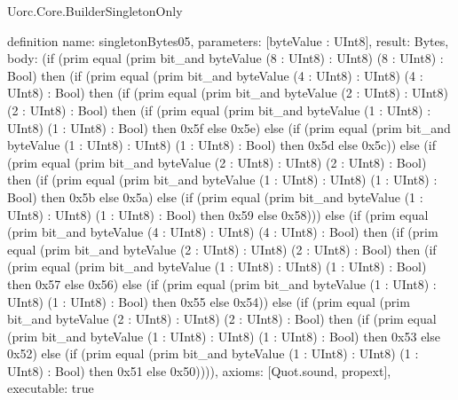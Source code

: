 \begin{lexlean}{Uorc.Core.BuilderSingletonOnly}
\begin{semanticmodule}
definition{
  name: singletonBytes05,
  parameters: [byteValue : UInt8],
  result: Bytes,
  body: (if (prim equal (prim bit_and byteValue (8 : UInt8) : UInt8) (8 : UInt8) : Bool) then (if (prim equal (prim bit_and byteValue (4 : UInt8) : UInt8) (4 : UInt8) : Bool) then (if (prim equal (prim bit_and byteValue (2 : UInt8) : UInt8) (2 : UInt8) : Bool) then (if (prim equal (prim bit_and byteValue (1 : UInt8) : UInt8) (1 : UInt8) : Bool) then 0x5f else 0x5e) else (if (prim equal (prim bit_and byteValue (1 : UInt8) : UInt8) (1 : UInt8) : Bool) then 0x5d else 0x5c)) else (if (prim equal (prim bit_and byteValue (2 : UInt8) : UInt8) (2 : UInt8) : Bool) then (if (prim equal (prim bit_and byteValue (1 : UInt8) : UInt8) (1 : UInt8) : Bool) then 0x5b else 0x5a) else (if (prim equal (prim bit_and byteValue (1 : UInt8) : UInt8) (1 : UInt8) : Bool) then 0x59 else 0x58))) else (if (prim equal (prim bit_and byteValue (4 : UInt8) : UInt8) (4 : UInt8) : Bool) then (if (prim equal (prim bit_and byteValue (2 : UInt8) : UInt8) (2 : UInt8) : Bool) then (if (prim equal (prim bit_and byteValue (1 : UInt8) : UInt8) (1 : UInt8) : Bool) then 0x57 else 0x56) else (if (prim equal (prim bit_and byteValue (1 : UInt8) : UInt8) (1 : UInt8) : Bool) then 0x55 else 0x54)) else (if (prim equal (prim bit_and byteValue (2 : UInt8) : UInt8) (2 : UInt8) : Bool) then (if (prim equal (prim bit_and byteValue (1 : UInt8) : UInt8) (1 : UInt8) : Bool) then 0x53 else 0x52) else (if (prim equal (prim bit_and byteValue (1 : UInt8) : UInt8) (1 : UInt8) : Bool) then 0x51 else 0x50)))),
  axioms: [Quot.sound, propext],
  executable: true
}


\end{semanticmodule}
\end{lexlean}
